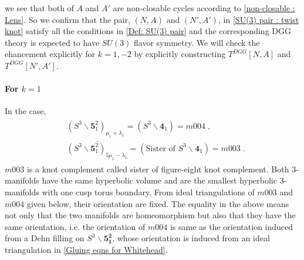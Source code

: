 \documentclass[a4paper,11pt]{article}
\begin{document}
%
we see that both of $A$ and $A'$ are non-closable cycles according to \eqref{non-closable : Lens}. So we confirm that the pair, $(N,A)$ and $(N',A')$, in \eqref{SU(3) pair : twist knot} satisfy all the conditions in \eqref{Def: SU(3) pair} and the corresponding DGG theory is expected to have $SU(3)$ flavor symmetry.  We will  check the ehancement explicitly for  $k=1,-2$ by explicitly constructing $T^{DGG}[N,A]$ and $T^{DGG}[N',A']$.

\paragraph{For $k=1$} In the case,
%
\begin{align}
\begin{split}
&(S^3\backslash \mathbf{5}^2_1)_{\mu_1 + \lambda_1} = (S^3\backslash \mathbf{4}_1) = m004\;,
\\
&\overline{(S^3\backslash \mathbf{5}^2_1)_{5\mu_1 -  \lambda_1}} = (\textrm{Sister of }S^3\backslash \mathbf{4}_1) = m003\;. \label{m003/m004 from whitehead}
\end{split}
\end{align}
%
$m003$ is a knot complement called  sister of figure-eight knot complement. Both 3-manifolds have the same hyperbolic volume and  are the smallest hyperbolic 3-manifolds with one cusp torus boundary. From  ideal triangulations of $m003$ and $m004$  given below, their orientation are fixed. The equality in the above  means not only that the two manifolds are homeomorphism but also that they have the same orientation, i.e. the orientation of $m004$ is same as the orientation induced from a Dehn filling on $S^3\backslash \mathbf{5^2_1}$, whose orientation is induced from an ideal triangulation in \eqref{Gluing eqns for Whitehead}.
\end{document}
